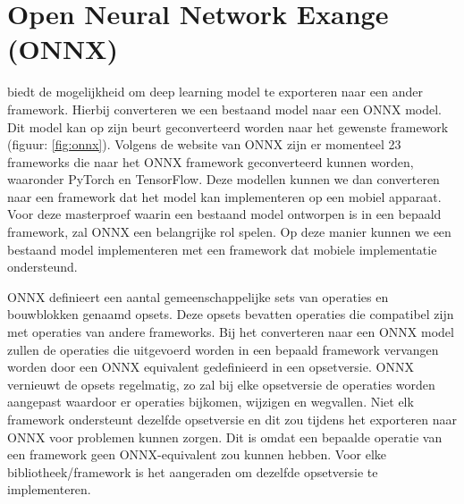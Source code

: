 


\section{Open Neural Network Exange (ONNX)}
\cite{onnx_onnx_2017} biedt de mogelijkheid om deep learning model te exporteren naar een ander framework.
Hierbij converteren we een bestaand model naar een ONNX model.
Dit model kan op zijn beurt geconverteerd worden naar het gewenste framework (figuur: \ref{fig:onnx}).
Volgens de website van ONNX zijn er momenteel 23 frameworks die naar het ONNX framework geconverteerd kunnen worden, waaronder PyTorch en TensorFlow.
Deze modellen kunnen we dan converteren naar een framework dat het model kan implementeren op een mobiel apparaat.
Voor deze masterproef waarin een bestaand model ontworpen is in een bepaald framework, zal ONNX een belangrijke rol spelen.
Op deze manier kunnen we een bestaand model implementeren met een framework dat mobiele implementatie ondersteund.

ONNX definieert een aantal gemeenschappelijke sets van operaties en bouwblokken genaamd opsets.
Deze opsets bevatten operaties die compatibel zijn met operaties van andere frameworks.
Bij het converteren naar een ONNX model zullen de operaties die uitgevoerd worden in een bepaald framework vervangen worden door een ONNX equivalent gedefinieerd in een opsetversie.
ONNX vernieuwt de opsets regelmatig, zo zal bij elke opsetversie de operaties worden aangepast waardoor er operaties bijkomen, wijzigen en wegvallen.
Niet elk framework ondersteunt dezelfde opsetversie en dit zou tijdens het exporteren naar ONNX voor problemen kunnen zorgen.
Dit is omdat een bepaalde operatie van een framework geen ONNX-equivalent zou kunnen hebben.
Voor elke bibliotheek/framework is het aangeraden om dezelfde opsetversie te implementeren.

